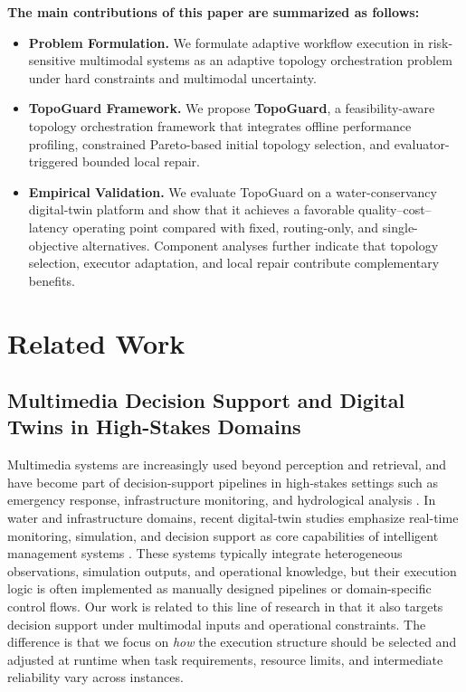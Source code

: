 \documentclass[manuscript,review,anonymous]{acmart}
\begin{document}
\noindent\textbf{The main contributions of this paper are summarized as follows:}
\begin{itemize}
    \item \textbf{Problem Formulation.} We formulate adaptive workflow execution in risk-sensitive multimodal systems as an adaptive topology orchestration problem under hard constraints and multimodal uncertainty.
    \item \textbf{TopoGuard Framework.} We propose \textbf{TopoGuard}, a feasibility-aware topology orchestration framework that integrates offline performance profiling, constrained Pareto-based initial topology selection, and evaluator-triggered bounded local repair.
    \item \textbf{Empirical Validation.} We evaluate TopoGuard on a water-conservancy digital-twin platform and show that it achieves a favorable quality--cost--latency operating point compared with fixed, routing-only, and single-objective alternatives. Component analyses further indicate that topology selection, executor adaptation, and local repair contribute complementary benefits.
\end{itemize}

\section{Related Work}
\label{sec:related_work}

\subsection{Multimedia Decision Support and Digital Twins in High-Stakes Domains}

Multimedia systems are increasingly used beyond perception and retrieval, and have become part of decision-support pipelines in high-stakes settings such as emergency response, infrastructure monitoring, and hydrological analysis \cite{tang2016emergency,pathak2020hydroinformatics,yu2024warenet}. In water and infrastructure domains, recent digital-twin studies emphasize real-time monitoring, simulation, and decision support as core capabilities of intelligent management systems \cite{li2024intelligentwater,ge2025urbanflooddt}. These systems typically integrate heterogeneous observations, simulation outputs, and operational knowledge, but their execution logic is often implemented as manually designed pipelines or domain-specific control flows. Our work is related to this line of research in that it also targets decision support under multimodal inputs and operational constraints. The difference is that we focus on \emph{how} the execution structure should be selected and adjusted at runtime when task requirements, resource limits, and intermediate reliability vary across instances.
\end{document}
